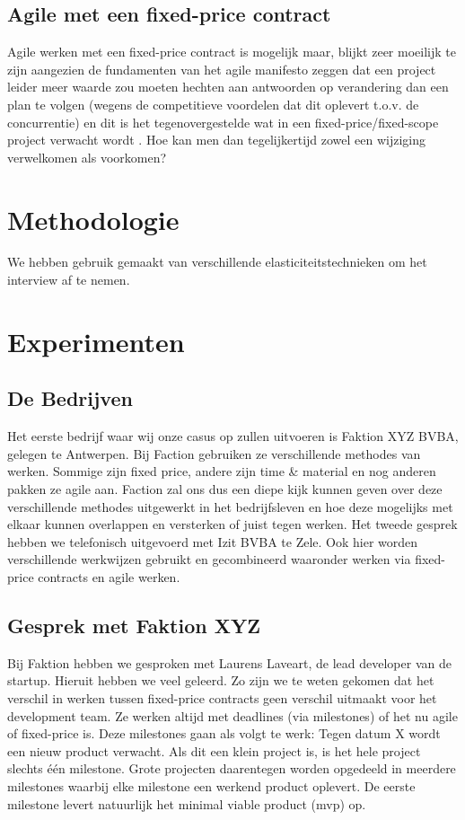 \documentclass{hogent-article}
\begin{document}
    \subsection{Agile met een fixed-price contract}
    Agile werken met een fixed-price contract is mogelijk maar, blijkt zeer moeilijk te zijn aangezien de fundamenten van het agile manifesto zeggen dat een project leider meer waarde zou moeten hechten aan antwoorden op verandering dan een plan te volgen (wegens de competitieve voordelen dat dit oplevert t.o.v. de concurrentie) en dit is het tegenovergestelde wat in een fixed-price/fixed-scope project verwacht wordt \autocite{PMI2011}. Hoe kan men dan tegelijkertijd zowel een wijziging verwelkomen als voorkomen?
	\section{Methodologie}
	We hebben gebruik gemaakt van verschillende elasticiteitstechnieken om het interview af te nemen.
	\section{Experimenten}
    \subsection{De Bedrijven}
    Het eerste bedrijf waar wij onze casus op zullen uitvoeren is Faktion XYZ BVBA, gelegen te Antwerpen. Bij Faction gebruiken ze verschillende methodes van werken. Sommige zijn fixed price, andere zijn time \& material en nog anderen pakken ze agile aan. Faction zal ons dus een diepe kijk kunnen geven over deze verschillende methodes uitgewerkt in het bedrijfsleven en hoe deze mogelijks met elkaar kunnen overlappen en versterken of juist tegen werken.
    \linebreak
    \linebreak
    Het tweede gesprek hebben we telefonisch uitgevoerd met Izit BVBA te Zele. Ook hier worden verschillende werkwijzen gebruikt en gecombineerd waaronder werken via fixed-price contracts en agile werken.
    
    \subsection{Gesprek met Faktion XYZ}
    Bij Faktion hebben we gesproken met Laurens Laveart, de lead developer van de startup. Hieruit hebben we veel geleerd. Zo zijn we te weten gekomen dat het verschil in werken tussen fixed-price contracts geen verschil uitmaakt voor het development team. Ze werken altijd met deadlines (via milestones) of het nu agile of fixed-price is. Deze milestones gaan als volgt te werk: Tegen datum X wordt een nieuw product verwacht. Als dit een klein project is, is het hele project slechts één milestone. Grote projecten daarentegen worden opgedeeld in meerdere milestones waarbij elke milestone een werkend product oplevert. De eerste milestone levert natuurlijk het minimal viable product (mvp) op.
    
\end{document}
